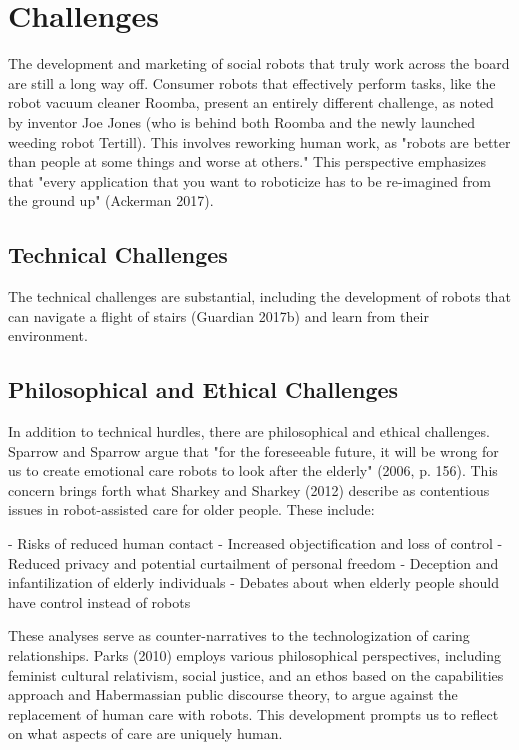 \section{Challenges}

The development and marketing of social robots that truly work across the board are still a long way off. Consumer robots that effectively perform tasks, like the robot vacuum cleaner Roomba, present an entirely different challenge, as noted by inventor Joe Jones (who is behind both Roomba and the newly launched weeding robot Tertill). This involves reworking human work, as "robots are better than people at some things and worse at others." This perspective emphasizes that "every application that you want to roboticize has to be re-imagined from the ground up" (Ackerman 2017).

\subsection{Technical Challenges}

The technical challenges are substantial, including the development of robots that can navigate a flight of stairs (Guardian 2017b) and learn from their environment. 

\subsection{Philosophical and Ethical Challenges}

In addition to technical hurdles, there are philosophical and ethical challenges. Sparrow and Sparrow argue that "for the foreseeable future, it will be wrong for us to create emotional care robots to look after the elderly" (2006, p. 156). This concern brings forth what Sharkey and Sharkey (2012) describe as contentious issues in robot-assisted care for older people. These include:

- Risks of reduced human contact
- Increased objectification and loss of control
- Reduced privacy and potential curtailment of personal freedom
- Deception and infantilization of elderly individuals
- Debates about when elderly people should have control instead of robots

These analyses serve as counter-narratives to the technologization of caring relationships. Parks (2010) employs various philosophical perspectives, including feminist cultural relativism, social justice, and an ethos based on the capabilities approach and Habermassian public discourse theory, to argue against the replacement of human care with robots. This development prompts us to reflect on what aspects of care are uniquely human.

